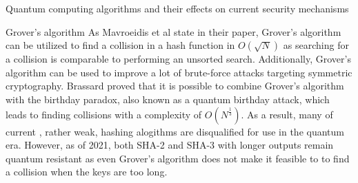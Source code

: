 \documentclass[aps,preprintnumbers,twocolumn]{revtex4}
\begin{document}
\begin{section}{Quantum computing algorithms and their effects on current security mechanisms}
\begin{subsection}{Grover's algorithm}
As Mavroeidis et al \cite[p.4]{DBLP:journals/corr/abs-1804-00200} state in their paper, Grover's algorithm can be utilized to find a collision in a hash function in $O(\sqrt{N})$ as searching for a collision is comparable to performing an unsorted search. 
Additionally, Grover's algorithm can be used to improve a lot of brute-force attacks targeting symmetric cryptography.
Brassard proved \cite{1998} that it is possible to combine Grover's algorithm with the birthday paradox, 
also known as a quantum birthday attack, which leads to finding collisions with a complexity of $O(N^{\frac{1}{3}})$.
As a result, many of current , rather weak, hashing alogithms are disqualified for use in the quantum era. 
However, as of 2021, both SHA-2 and SHA-3 with longer outputs remain quantum resistant as even Grover's algorithm does not make it feasible to to find a collision when the keys are too long.
\end{subsection}

\end{section}
\end{document}
